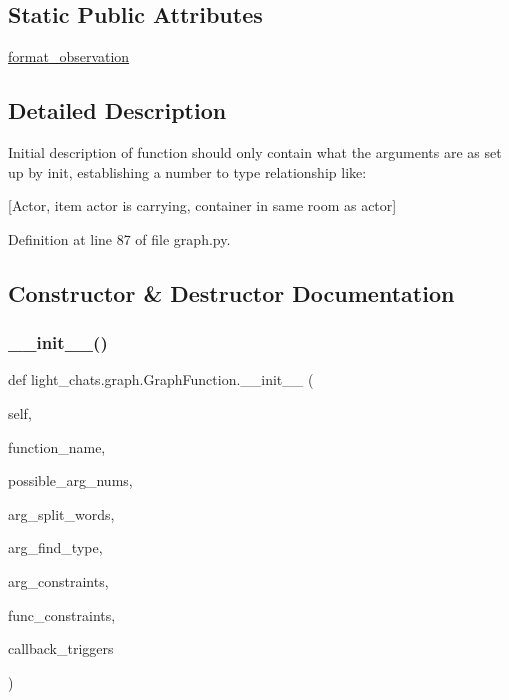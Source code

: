 \subsection*{Static Public Attributes}
\begin{DoxyCompactItemize}
\item 
\hyperlink{classlight__chats_1_1graph_1_1GraphFunction_a40c1214e286a5c8ca375aae48bf36d89}{format\+\_\+observation}
\end{DoxyCompactItemize}


\subsection{Detailed Description}
\begin{DoxyVerb}Initial description of function should only contain what the arguments are as set up
by init, establishing a number to type relationship like:

[Actor, item actor is carrying, container in same room as actor]
\end{DoxyVerb}
 

Definition at line 87 of file graph.\+py.



\subsection{Constructor \& Destructor Documentation}
\mbox{\label{classlight__chats_1_1graph_1_1GraphFunction_afcb6dd9e771c4db34f5af22588e6190e}} 
\subsubsection{\texorpdfstring{\+\_\+\+\_\+init\+\_\+\+\_\+()}{\_\_init\_\_()}}
{\footnotesize\ttfamily def light\+\_\+chats.\+graph.\+Graph\+Function.\+\_\+\+\_\+init\+\_\+\+\_\+ (\begin{DoxyParamCaption}\item[{}]{self,  }\item[{}]{function\+\_\+name,  }\item[{}]{possible\+\_\+arg\+\_\+nums,  }\item[{}]{arg\+\_\+split\+\_\+words,  }\item[{}]{arg\+\_\+find\+\_\+type,  }\item[{}]{arg\+\_\+constraints,  }\item[{}]{func\+\_\+constraints,  }\item[{}]{callback\+\_\+triggers }\end{DoxyParamCaption})}

